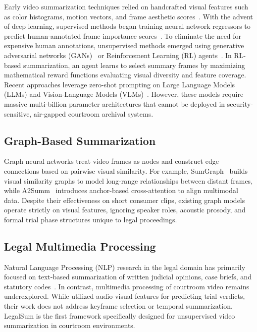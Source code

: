 \documentclass[letterpaper]{article}
\begin{document}
Early video summarization techniques relied on handcrafted visual features such as color histograms, motion vectors, and frame aesthetic scores~\cite{gygli2014creating,song2015tvsum}. With the advent of deep learning, supervised methods began training neural network regressors to predict human-annotated frame importance scores~\cite{zhang2016video,fajtl2018summarizing}. To eliminate the need for expensive human annotations, unsupervised methods emerged using generative adversarial networks (GANs)~\cite{mahasseni2017unsupervised} or Reinforcement Learning (RL) agents~\cite{zhou2018deep}. In RL-based summarization, an agent learns to select summary frames by maximizing mathematical reward functions evaluating visual diversity and feature coverage. Recent approaches leverage zero-shot prompting on Large Language Models (LLMs) and Vision-Language Models (VLMs)~. However, these models require massive multi-billion parameter architectures that cannot be deployed in security-sensitive, air-gapped courtroom archival systems.

\subsection{Graph-Based Summarization}

Graph neural networks treat video frames as nodes and construct edge connections based on pairwise visual similarity. For example, SumGraph~\cite{park2020sumgraph} builds visual similarity graphs to model long-range relationships between distant frames, while A2Summ~\cite{he2023a2summ} introduces anchor-based cross-attention to align multimodal data. Despite their effectiveness on short consumer clips, existing graph models operate strictly on visual features, ignoring speaker roles, acoustic prosody, and formal trial phase structures unique to legal proceedings.

\subsection{Legal Multimedia Processing}

Natural Language Processing (NLP) research in the legal domain has primarily focused on text-based summarization of written judicial opinions, case briefs, and statutory codes~\cite{zhong2020iteratively}. In contrast, multimedia processing of courtroom video remains underexplored. While \citet{sharma2021multimodal} utilized audio-visual features for predicting trial verdicts, their work does not address keyframe selection or temporal summarization. LegalSum is the first framework specifically designed for unsupervised video summarization in courtroom environments.
\end{document}
